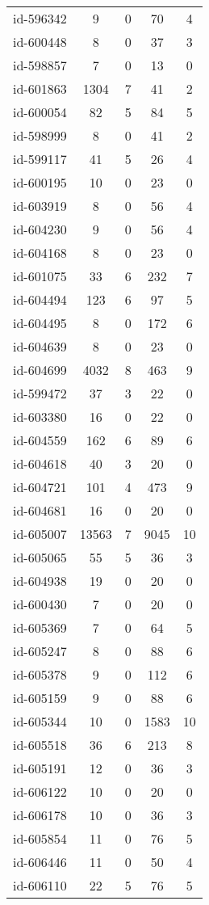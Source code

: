 \begin{tabular}{ccccc}
id-596342 & 9 & 0 & 70 & 4\\
id-600448 & 8 & 0 & 37 & 3\\
id-598857 & 7 & 0 & 13 & 0\\
id-601863 & 1304 & 7 & 41 & 2\\
id-600054 & 82 & 5 & 84 & 5\\
id-598999 & 8 & 0 & 41 & 2\\
id-599117 & 41 & 5 & 26 & 4\\
id-600195 & 10 & 0 & 23 & 0\\
id-603919 & 8 & 0 & 56 & 4\\
id-604230 & 9 & 0 & 56 & 4\\
id-604168 & 8 & 0 & 23 & 0\\
id-601075 & 33 & 6 & 232 & 7\\
id-604494 & 123 & 6 & 97 & 5\\
id-604495 & 8 & 0 & 172 & 6\\
id-604639 & 8 & 0 & 23 & 0\\
id-604699 & 4032 & 8 & 463 & 9\\
id-599472 & 37 & 3 & 22 & 0\\
id-603380 & 16 & 0 & 22 & 0\\
id-604559 & 162 & 6 & 89 & 6\\
id-604618 & 40 & 3 & 20 & 0\\
id-604721 & 101 & 4 & 473 & 9\\
id-604681 & 16 & 0 & 20 & 0\\
id-605007 & 13563 & 7 & 9045 & 10\\
id-605065 & 55 & 5 & 36 & 3\\
id-604938 & 19 & 0 & 20 & 0\\
id-600430 & 7 & 0 & 20 & 0\\
id-605369 & 7 & 0 & 64 & 5\\
id-605247 & 8 & 0 & 88 & 6\\
id-605378 & 9 & 0 & 112 & 6\\
id-605159 & 9 & 0 & 88 & 6\\
id-605344 & 10 & 0 & 1583 & 10\\
id-605518 & 36 & 6 & 213 & 8\\
id-605191 & 12 & 0 & 36 & 3\\
id-606122 & 10 & 0 & 20 & 0\\
id-606178 & 10 & 0 & 36 & 3\\
id-605854 & 11 & 0 & 76 & 5\\
id-606446 & 11 & 0 & 50 & 4\\
id-606110 & 22 & 5 & 76 & 5\\

\end{tabular}
